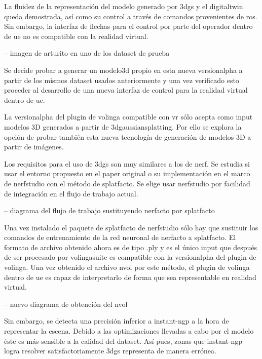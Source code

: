 \documentclass[a4paper, 12pt, spanish, twoside]{article}
\begin{document}
La fluidez de la representación del modelo generado por \acrshort{3dgs} y el \gls{digitaltwin} queda demostrada, así como su control a través de comandos provenientes de \acrshort{ros}. Sin embargo, la interfaz de flechas para el control por parte del operador dentro de \acrshort{ue} no es compatible con la realidad virtual. 

-- imagen de arturito en uno de los dataset de prueba 

Se decide probar a generar un \gls{modelo3d} propio en esta nueva \gls{versionalpha} a partir de los mismos \gls{dataset} usados anteriormente y una vez verificado esto proceder al desarrollo de una nueva interfaz de control para la realidad virtual dentro de \acrshort{ue}. 

La \gls{versionalpha} del \gls{plugin} de \gls{volinga} compatible con \acrshort{vr} sólo acepta como input modelos 3D generados a partir de \gls{3dgaussiansplatting}. Por ello se explora la opción de probar también esta nueva tecnología de generación de modelos 3D a partir de imágenes. 

Los requisitos para el uso de \acrshort{3dgs} son muy similares a los de \acrshort{nerf}. Se estudia si usar el entorno propuesto en el paper original o su implementación en el marco de \gls{nerfstudio} con el método de \gls{splatfacto}. Se elige usar \gls{nerfstudio} por facilidad de integración en el flujo de trabajo actual. 

-- diagrama del flujo de trabajo sustituyendo nerfacto por splatfacto 

Una vez instalado el paquete de \gls{splatfacto} de \gls{nerfstudio} sólo hay que sustituir los comandos de entrenamiento de la red neuronal de \gls{nerfacto} a \gls{splatfacto}. El formato de archivo obtenido ahora es de tipo .ply y es el único input que después de ser procesado por \gls{volingasuite} es compatible con la \gls{versionalpha} del \gls{plugin} de \gls{volinga}. Una vez obtenido el archivo \gls{nvol} por este método, el \gls{plugin} de \gls{volinga} dentro de \acrshort{ue} es capaz de interpretarlo de forma que sea representable en realidad virtual. 

-- nuevo diagrama de obtención del nvol 

Sin embargo, se detecta una precisión inferior a \gls{instant-ngp} a la hora de representar la escena. Debido a las optimizaciones llevadas a cabo por el modelo éste es más sensible a la calidad del \gls{dataset}. Así pues, zonas que \gls{instant-ngp} logra resolver satisfactoriamente \acrshort{3dgs} representa de manera errónea. 
\end{document}
